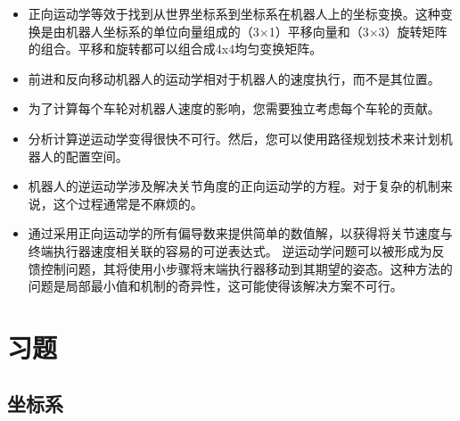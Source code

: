 \begin{itemize}
\item 正向运动学等效于找到从世界坐标系到坐标系在机器人上的坐标变换。这种变换是由机器人坐标系的单位向量组成的（3×1）平移向量和（3×3）旋转矩阵的组合。平移和旋转都可以组合成4x4均匀变换矩阵。
\item 前进和反向移动机器人的运动学相对于机器人的速度执行，而不是其位置。
\item 为了计算每个车轮对机器人速度的影响，您需要独立考虑每个车轮的贡献。
\item 分析计算逆运动学变得很快不可行。然后，您可以使用路径规划技术来计划机器人的配置空间。
\item 机器人的逆运动学涉及解决关节角度的正向运动学的方程。对于复杂的机制来说，这个过程通常是不麻烦的。
\item 通过采用正向运动学的所有偏导数来提供简单的数值解，以获得将关节速度与终端执行器速度相关联的容易的可逆表达式。
逆运动学问题可以被形成为反馈控制问题，其将使用小步骤将末端执行器移动到其期望的姿态。这种方法的问题是局部最小值和机制的奇异性，这可能使得该解决方案不可行。
\end{itemize}

\section*{习题}\small
\subsection*{坐标系}

